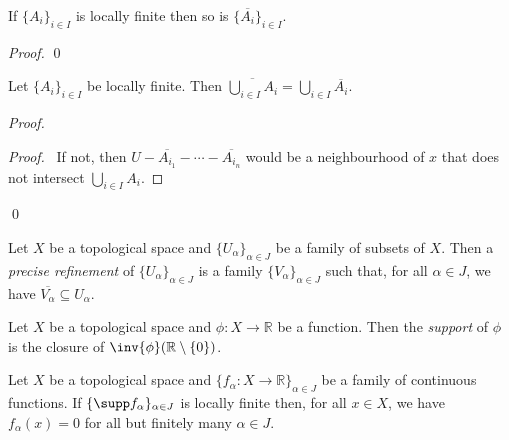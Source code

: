 \begin{lm}
  \label{lm:topology:closure:locally_finite}
  If $\{ A_i \}_{i \in I}$ is locally finite then so is $\{ \overline{A_i} \}_{i \in I}$.
\end{lm}

\begin{proof}
  \pf
  \qed
\end{proof}

\begin{lm}
  \label{lm:topology:closure:locally_finite_union}
  Let $\{ A_i \}_{i \in I}$ be locally finite. Then $\overline{\bigcup_{i \in I} A_i} = \bigcup_{i \in I} \overline{A_i}$.
\end{lm}

\begin{proof}
  \pf
  \begin{proof}
    \pf\ If not, then $U - \overline{A_{i_1}} - \cdots - \overline{A_{i_n}}$ would be a neighbourhood of $x$ that does not intersect $\bigcup_{i \in I} A_i$.
  \end{proof}
  \qed
\end{proof}

\begin{df}
  Let $X$ be a topological space and $\{ U_\alpha \}_{\alpha \in J}$ be a family of subsets of $X$. Then a \emph{precise refinement} of $\{ U_\alpha \}_{\alpha \in J}$ is a family $\{ V_\alpha \}_{\alpha \in J}$ such that, for all $\alpha \in J$, we have $\overline{V_\alpha} \subseteq U_\alpha$.
\end{df}

\begin{df}[Support]
 Let $X$ be a topological space and $\phi : X \rightarrow \mathbb{R}$ be a
 function. Then the \emph{support} of $\phi$ is the closure of
 $\inv{\phi}(\mathbb{R} \setminus \{ 0 \})$.
\end{df}

\begin{lm}
  Let $X$ be a topological space and $\{ f_\alpha : X \rightarrow \mathbb{R} \}_{\alpha \in J}$ be a family of continuous functions. If $\{ \supp f_\alpha \}_{\alpha \in J}$ is locally finite then, for all $x \in X$, we have $f_\alpha(x) = 0$ for all but finitely many $\alpha \in J$.
\end{lm}

